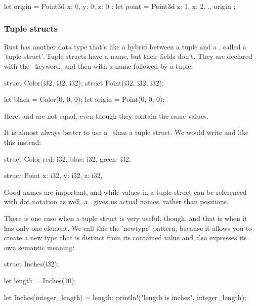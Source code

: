 \begin{rustc}
let origin = Point3d { x: 0, y: 0, z: 0 };
let point = Point3d { z: 1, x: 2, .. origin };
\end{rustc}

\subsubsection*{Tuple structs}

Rust has another data type that's like a hybrid between a tuple and a \struct, called a 'tuple struct'. Tuple structs have a name, 
but their fields don't. They are declared with the \struct\ keyword, and then with a name followed by a tuple:

\begin{rustc}
struct Color(i32, i32, i32);
struct Point(i32, i32, i32);

let black = Color(0, 0, 0);
let origin = Point(0, 0, 0);
\end{rustc}

Here,  and  are not equal, even though they contain the same values.

\blank

It is almost always better to use a \struct\ than a tuple struct. We would write  and  like this instead:

\begin{rustc}
struct Color {
    red: i32,
    blue: i32,
    green: i32,
}

struct Point {
    x: i32,
    y: i32,
    z: i32,
}
\end{rustc}

Good names are important, and while values in a tuple struct can be referenced with dot notation as well, a \struct\ gives us 
actual names, rather than positions.

\blank

There is one case when a tuple struct is very useful, though, and that is when it has only one element. We call this the 'newtype' 
pattern, because it allows you to create a new type that is distinct from its contained value and also expresses its own semantic 
meaning:

\begin{rustc}
struct Inches(i32);

let length = Inches(10);

let Inches(integer_length) = length;
println!("length is {} inches", integer_length);
\end{rustc}

